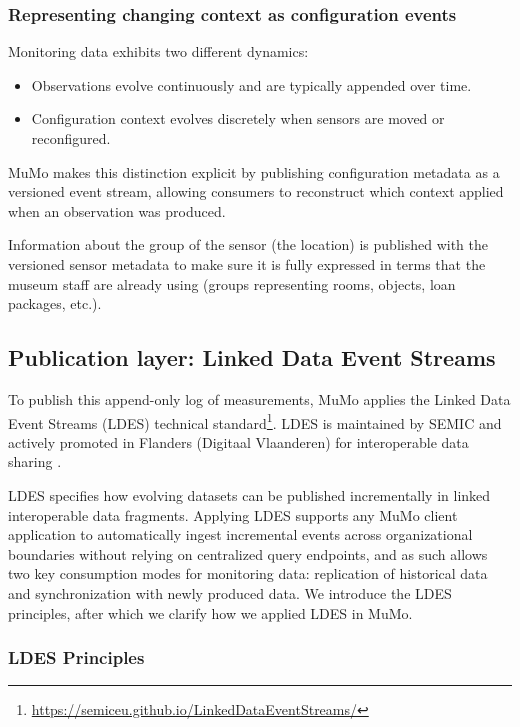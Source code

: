 \subsubsection{Representing changing context as configuration
events}\label{representing-changing-context-as-configuration-events}

Monitoring data exhibits two different dynamics:

\begin{itemize}
\tightlist
\item
  Observations evolve continuously and are typically appended over time.
\item
  Configuration context evolves discretely when sensors are moved or
  reconfigured.
\end{itemize}

MuMo makes this distinction explicit by publishing configuration
metadata as a versioned event stream, allowing consumers to reconstruct
which context applied when an observation was produced.

Information about the group of the sensor (the location) is published
with the versioned sensor metadata to make sure it is fully expressed in
terms that the museum staff are already using (groups representing
rooms, objects, loan packages, etc.).

\subsection{Publication layer: Linked Data Event
Streams}\label{sec:ldes}

To publish this append-only log of measurements, MuMo applies the Linked
Data Event Streams (LDES) technical
standard\footnote{\url{https://semiceu.github.io/LinkedDataEventStreams/}}.
LDES is maintained by SEMIC and actively promoted in Flanders (Digitaal
Vlaanderen) for interoperable data sharing
\cite{semic_support_centre, vanlancker2021ldes}.

LDES specifies how evolving datasets can be published incrementally in
linked interoperable data fragments. Applying LDES supports any MuMo
client application to automatically ingest incremental events across
organizational boundaries without relying on centralized query
endpoints, and as such allows two key consumption modes for monitoring
data: replication of historical data and synchronization with newly
produced data. We introduce the LDES principles, after which we clarify
how we applied LDES in MuMo.

\subsubsection{LDES Principles}\label{ldes-principles}

